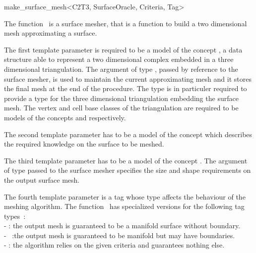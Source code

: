 

\begin{ccRefFunction}{make_surface_mesh<C2T3, SurfaceOracle,
Criteria, Tag>}  %


\ccDefinition
  
The function \ccRefName\ is a surface mesher,
that is a function to build a two dimensional mesh 
approximating  a surface.

The first template parameter  
is required to be a model of the concept
,
a data structure able to represent a two dimensional
complex  embedded in a three dimensional triangulation.
The argument  of type ,  passed by reference
to the surface mesher, 
is used to maintain  the current approximating mesh and it stores
the final mesh at the end of the procedure.
The type  is in particuler required to
provide a type 
for the three dimensional triangulation
embedding the surface mesh.
The vertex and cell base classes of the triangulation
 are required
to be  models  of the concepts 
 and 
 respectively.


The second template parameter  has to be a model
of the concept
 which describes the required knowledge
on the surface to be meshed. 


The third template parameter  has to be a model
of the concept .
The argument of type   passed to the surface
mesher specifies the size and shape  requirements
on the output surface mesh.

The fourth template parameter is a tag whose type affects the behaviour of the
meshing algorithm. The function \ccRefName\  has specialized versions
for the following  tag types~: \\
- : the output mesh is guaranteed to be a manifold
surface without boundary.\\
- ~:the output mesh is guaranteed to be
manifold but may have boundaries.\\
-  : the algorithm relies on the given criteria and
guarantees nothing else.




\end{ccRefFunction}
